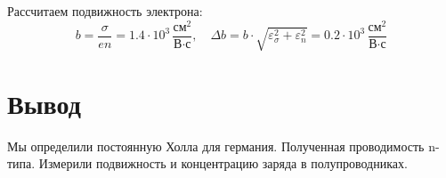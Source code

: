 \documentclass[a4paper, 12pt]{article}
\begin{document}
Рассчитаем подвижность электрона:
$$b = \dfrac{\sigma}{en} = 1.4 \cdot 10^{3}\,\dfrac{\text{см}^2}{\text{В} \cdot \text{с}},\quad \Delta b=b\cdot\sqrt{\varepsilon_\sigma^2+\varepsilon_n^2}=0.2\cdot 10^{3}\,\dfrac{\text{см}^2}{\text{В} \cdot \text{с}}$$

\section{Вывод}

Мы определили постоянную Холла для германия. Полученная проводимость n-типа. Измерили подвижность и концентрацию заряда в полупроводниках.
\end{document}
